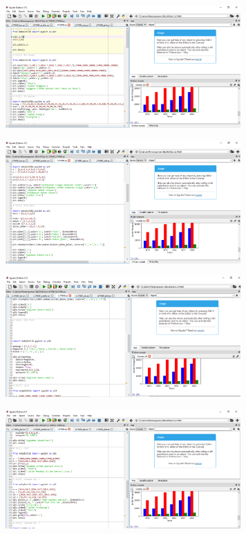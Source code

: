 \begin{figure}[H]
	\includegraphics[width=9cm]{figures/6/1174089/Praktek/c5.png}
	\centering
\end{figure}
\begin{figure}[H]
	\includegraphics[width=9cm]{figures/6/1174089/Praktek/c6.png}
	\centering
\end{figure}
\begin{figure}[H]
	\includegraphics[width=9cm]{figures/6/1174089/Praktek/c7.png}
	\centering
\end{figure}
\begin{figure}[H]
	\includegraphics[width=9cm]{figures/6/1174089/Praktek/c8.png}
	\centering
\end{figure}
